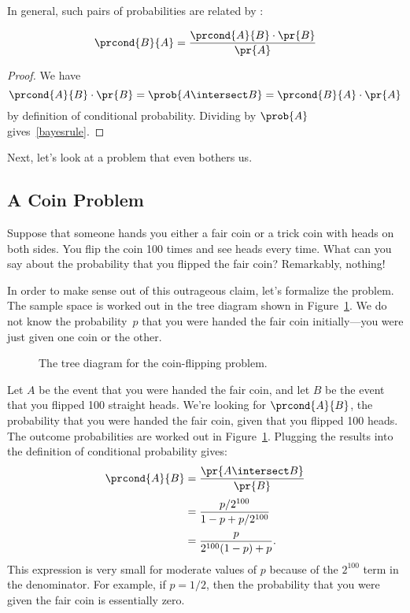 In general, such pairs of probabilities are related by :
%
\begin{theorem}
%
\begin{equation}\label{bayesrule}
    \prcond{B}{A} = \frac{\prcond{A}{B} \cdot \pr{B}}{\pr{A}}
\end{equation}
\end{theorem}

\begin{proof}
We have
\[
\prcond{A}{B} \cdot \pr{B} = \prob{A \intersect B} = \prcond{B}{A} \cdot \pr{A}
\]
by definition of conditional probability.  Dividing by $\prob{A}$
gives~\eqref{bayesrule}.
\end{proof}

\iffalse

Next, let's look at a problem that even bothers us.

\subsection{A Coin Problem}

Suppose that someone hands you either a fair coin or a trick coin with
heads on both sides.  You flip the coin 100 times and see heads every
time.  What can you say about the probability that you flipped the
fair coin?  Remarkably, nothing!

In order to make sense out of this outrageous claim, let's formalize
the problem.  The sample space is worked out in the tree diagram shown
in Figure~\ref{fig:15C2}.  We do not know the probability~$p$ that you
were handed the fair coin initially---you were just given one coin or
the other.
%
\begin{figure}[h]


\caption{The tree diagram for the coin-flipping problem.}

\label{fig:15C2}

\end{figure}
%
Let $A$ be the event that you were handed the fair coin, and let $B$
be the event that you flipped 100 straight heads.  We're looking
for $\prcond{A}{B}$, the probability that you were handed the fair
coin, given that you flipped 100 heads.  The outcome probabilities are
worked out in Figure~\ref{fig:15C2}.  Plugging the results into the
definition of conditional probability gives:
%
\begin{align*}
\prcond{A}{B}	& = \frac{\pr{A \intersect B}}{\pr{B}} \\[2pt]
		& = \frac{p / 2^{100}}{1 - p + p / 2^{100}} \\[2pt]
		& = \frac{p}{2^{100} (1 - p) + p}.
\end{align*}
%
This expression is very small for moderate values of $p$ because of
the $2^{100}$ term in the denominator.  For example, if $p = 1/2$,
then the probability that you were given the fair coin is essentially
zero.

